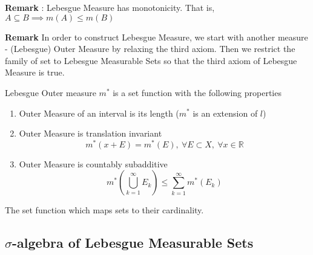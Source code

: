 \textbf{Remark} : Lebesgue Measure has monotonicity. That is, $A \subseteq B \implies m(A) \le m(B)$

\textbf{Remark} In order to construct Lebesgue Measure, we start with another measure - (Lebesgue) Outer Measure by relaxing the third axiom. Then we restrict the family of set to Lebesgue Measurable Sets so that the third axiom of Lebesgue Measure is true.

\begin{definition}
	Lebesgue Outer measure $m^\ast$ is a set function with the following properties
	\begin{enumerate}
		\item Outer Measure of an interval is its length ($m^\ast$ is an extension of $l$)
		\item Outer Measure is translation invariant
	$$m^\ast(x+E) = m^\ast(E),\ \forall E \subset X,\ \forall x \in \mathbb{R}$$
		\item Outer Measure is countably subadditive
	 $$m^\ast \left( \bigcup_{k=1}^\infty E_k \right) \le \sum_{k=1}^\infty m^\ast (E_k) $$
	\end{enumerate}
\end{definition}

\begin{definition}
	The set function which maps sets to their cardinality.
\end{definition}

\subsection{$\sigma$-algebra of Lebesgue Measurable Sets}
